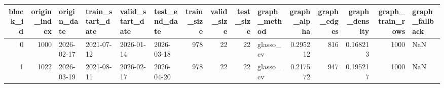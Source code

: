 \begin{tabular}{rrllllrrrlrrrrl}
\toprule
block_id & origin_index & origin_date & train_start_date & valid_start_date & test_end_date & train_size & valid_size & test_size & graph_method & graph_alpha & graph_edges & graph_density & graph_train_rows & graph_fallback \\
\midrule
0 & 1000 & 2026-02-17 & 2021-07-12 & 2026-01-14 & 2026-03-18 & 978 & 22 & 22 & glasso_cv & 0.295212 & 816 & 0.168213 & 1000 & NaN \\
1 & 1022 & 2026-03-19 & 2021-08-11 & 2026-02-17 & 2026-04-20 & 978 & 22 & 22 & glasso_cv & 0.217572 & 947 & 0.195217 & 1000 & NaN \\
\bottomrule
\end{tabular}
